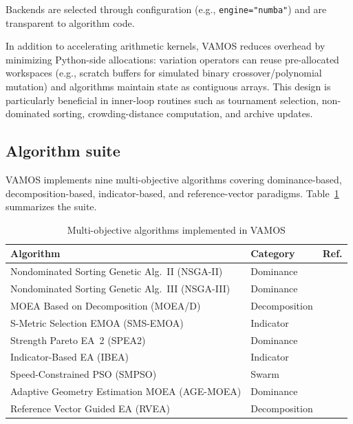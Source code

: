 \documentclass[journal]{IEEEtran}
\newcommand{\VAMOS}{VAMOS}
\begin{document}
Backends are selected through configuration (e.g., \texttt{engine="numba"}) and are transparent to algorithm code.

In addition to accelerating arithmetic kernels, \VAMOS{} reduces overhead by minimizing Python-side allocations: variation operators can reuse pre-allocated workspaces (e.g., scratch buffers for simulated binary crossover/polynomial mutation) and algorithms maintain state as contiguous arrays. This design is particularly beneficial in inner-loop routines such as tournament selection, non-dominated sorting, crowding-distance computation, and archive updates.

\subsection{Algorithm suite}

\VAMOS{} implements nine multi-objective algorithms covering dominance-based, decomposition-based, indicator-based, and reference-vector paradigms. Table~\ref{tab:algorithms} summarizes the suite.

\begin{table}[htbp]
\centering
\caption{Multi-objective algorithms implemented in \VAMOS{}}
\label{tab:algorithms}
\setlength{\tabcolsep}{3pt}
\begin{tabular}{llc}
\toprule
\textbf{Algorithm} & \textbf{Category} & \textbf{Ref.} \\
\midrule
Nondominated Sorting Genetic Alg.~II (NSGA-II) & Dominance & \cite{DPA+02} \\
Nondominated Sorting Genetic Alg.~III (NSGA-III) & Dominance & \cite{DJ14} \\
MOEA Based on Decomposition (MOEA/D) & Decomposition & \cite{ZL07} \\
S-Metric Selection EMOA (SMS-EMOA) & Indicator & \cite{BNE07} \\
Strength Pareto EA~2 (SPEA2) & Dominance & \cite{ZLT01} \\
Indicator-Based EA (IBEA) & Indicator & \cite{ZK04} \\
Speed-Constrained PSO (SMPSO) & Swarm & \cite{NDC09} \\
Adaptive Geometry Estimation MOEA (AGE-MOEA) & Dominance & \cite{panichella19} \\
Reference Vector Guided EA (RVEA) & Decomposition & \cite{CJO+16} \\
\bottomrule
\end{tabular}
\end{table}
\end{document}
